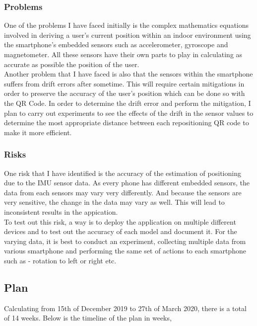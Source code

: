\documentclass[11pt]{article}
\begin{document}
\subsubsection{Problems}\label{problems}

One of the problems I have faced initially is the complex mathematics equations involved in deriving a user's current position within an indoor environment using the smartphone's embedded sensors such as accelerometer, gyroscope and magnetometer. All these sensors have their own parts to play in calculating as accurate as possible the position of the user.\\

Another problem that I have faced is also that the sensors within the smartphone suffers from drift errors after sometime. This will require certain mitigations in order to preserve the accuracy of the user's position which can be done so with the QR Code. In order to determine the drift error and perform the mitigation, I plan to carry out experiments to see the effects of the drift in the sensor values to determine the most appropriate distance between each repositioning QR code to make it more efficient.

\subsubsection{Risks}\label{risks}

One risk that I have identified is the accuracy of the estimation of positioning due to the IMU sensor data. As every phone has different embedded sensors, the data from each sensors may vary very differently. And because the sensors are very sensitive, the change in the data may vary as well. This will lead to inconsistent results in the appication.\\
 
To test out this risk, a way is to deploy the application on multiple different devices and to test out the accuracy of each model and document it. For the varying data, it is best to conduct an experiment, collecting multiple data from various smartphone and performing the same set of actions to each smartphone such as - rotation to left or right etc.

\subsection{Plan}\label{plan}

Calculating from 15th of December 2019 to 27th of March 2020, there is a total of 14 weeks. Below is the timeline of the plan in weeks,
\end{document}
